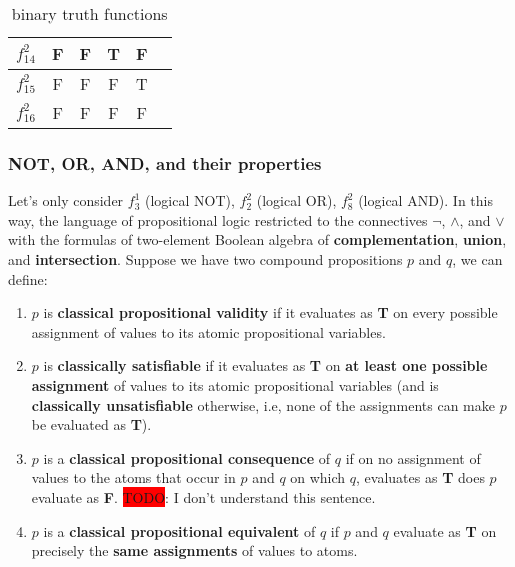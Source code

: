 \documentclass[12pt, letterpaper]{article}
\begin{document}
\begin{table}[H]
\begin{tabular}{|c|c|c|c|c|c|}
  $f_{14}^2$ & F                      & F                      & T                      & F                      &         \\ [0.5ex] \hline
  $f_{15}^2$ & F                      & F                      & F                      & T                      &         \\ [0.5ex] \hline
  $f_{16}^2$ & F                      & F                      & F                      & F                      &         \\ [0.5ex] \hline
  \end{tabular}
  \caption{binary truth functions}
\end{table}

\subsubsection{NOT, OR, AND, and their properties}

Let's only consider $f_3^1$ (logical NOT), $f_2^2$ (logical OR), $f_8^2$
(logical AND). In this way, the language of propositional logic restricted to
the connectives $\lnot$, $\land$, and $\lor$ with the formulas of two-element
Boolean algebra of \textbf{complementation}, \textbf{union}, and \textbf{
intersection}. Suppose we have two compound propositions $p$ and $q$, we can
define:
\begin{enumerate}
  \item $p$ is \textbf{classical propositional validity} if it evaluates as
    \textbf{T} on every possible assignment of values to its atomic
    propositional variables.
  \item $p$ is \textbf{classically satisfiable} if it evaluates as \textbf{T}
    on \textbf{at least one possible assignment} of values to its atomic
    propositional variables (and is \textbf{classically unsatisfiable}
    otherwise, i.e, none of the assignments can make $p$ be evaluated as
    \textbf{T}).
  \item $p$ is a \textbf{classical propositional consequence} of $q$ if on no
    assignment of values to the atoms that occur in $p$ and $q$ on which $q$,
    evaluates as \textbf{T} does $p$ evaluate as \textbf{F}.
    \colorbox{red}{TODO}: I don't understand this sentence.
  \item $p$ is a \textbf{classical propositional equivalent} of $q$ if $p$ and
    $q$ evaluate as \textbf{T} on precisely the \textbf{same assignments} of
    values to atoms.
\end{enumerate}
\end{document}
